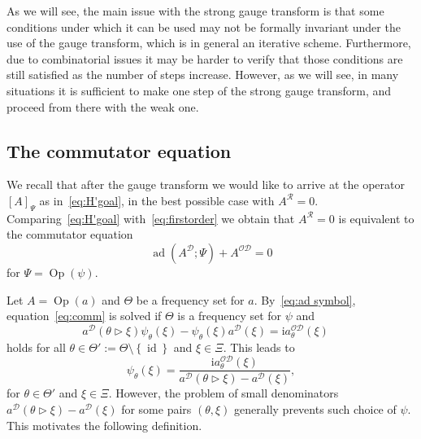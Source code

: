\documentclass[AHL,Unicode,longabstracts,published]{cedram}
\DeclareMathOperator{\ad}{ad}
\DeclareMathOperator{\Op}{Op}
\DeclareMathOperator{\id}{id}
\newcommand{\rmi}{\mathrm{i}}
\newcommand{\CD}{\mathcal{D}}
\newcommand{\CO}{\mathcal{O}}
\newcommand{\CR}{\mathcal{R}}
\newcommand{\COD}{{\CO\CD}}
\newcommand{\act}{\triangleright}
\newcommand{\set}[1]{\left\{ #1 \right\}}
\begin{document}
As we will see, the main issue with the strong gauge transform is that some conditions under which it can be used may not be formally invariant under the use of the gauge transform, which is in general an iterative scheme. Furthermore, due to combinatorial issues it may be harder to verify that those conditions are still satisfied as the number of steps increase. However, as we will see, in many situations it is sufficient to make one step of the strong gauge transform, and proceed from there with the weak one.



\subsection{The commutator equation}
We recall that after the gauge transform we would like to arrive at the operator $[A]_\Psi$ as in~\eqref{eq:H'goal}, in the best possible case with $A^{\CR}=0$. Comparing~\eqref{eq:H'goal} with~\eqref{eq:firstorder} we obtain that $A^{\CR}=0$ is equivalent to the commutator equation
\begin{equation}\label{eq:comm}
\ad\left(A^\CD;\Psi\right) + A^{\COD} = 0
\end{equation}
for $\Psi = \Op(\psi)$.

Let $A=\Op(a)$ and $\Theta$ be a frequency set for $a$. By~\eqref{eq:ad symbol}, equation~\eqref{eq:comm} is solved if $\Theta$ is a frequency set for $\psi$ and
\begin{equation}
a^\CD(\theta \act \xi) \psi_\theta(\xi) - \psi_\theta(\xi)a^\CD(\xi) = \rmi a^\COD_\theta(\xi)\quad
\end{equation}
holds for all $\theta\in\Theta':=\Theta\setminus \set{\id}$ and $\xi\in\Xi$. This leads to
\begin{equation}\label{eq:eq}
\psi_\theta(\xi) = \frac{\rmi a^\COD_\theta(\xi)}{a^{\CD}(\theta\act\xi) - a^\CD(\xi)},
\end{equation}
for $\theta\in\Theta'$ and $\xi\in\Xi$. However, the problem of small denominators $a^\CD(\theta\act\xi) - a^\CD(\xi)$ for some pairs $(\theta,\xi)$ generally prevents such choice of $\psi$. This motivates the following definition.
\end{document}

